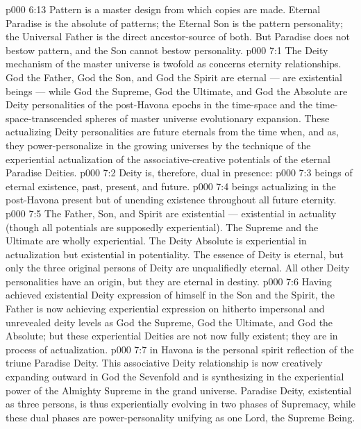 \vs p000 6:13 Pattern is a master design from which copies are made. Eternal Paradise is the absolute of patterns; the Eternal Son is the pattern personality; the Universal Father is the direct ancestor\hyp{}source of both. But Paradise does not bestow pattern, and the Son cannot bestow personality.
\vs p000 7:1 The Deity mechanism of the master universe is twofold as concerns eternity relationships. God the Father, God the Son, and God the Spirit are eternal --- are existential beings --- while God the Supreme, God the Ultimate, and God the Absolute are  Deity personalities of the post\hyp{}Havona epochs in the time\hyp{}space and the time\hyp{}space\hyp{}transcended spheres of master universe evolutionary expansion. These actualizing Deity personalities are future eternals from the time when, and as, they power\hyp{}personalize in the growing universes by the technique of the experiential actualization of the associative\hyp{}creative potentials of the eternal Paradise Deities.
\vs p000 7:2 Deity is, therefore, dual in presence:
\vs p000 7:3 \bibnobreakspace {} beings of eternal existence, past, present, and future.
\vs p000 7:4 \bibnobreakspace {} beings actualizing in the post\hyp{}Havona present but of unending existence throughout all future eternity.
\vs p000 7:5 \pc The Father, Son, and Spirit are existential --- existential in actuality (though all potentials are supposedly experiential). The Supreme and the Ultimate are wholly experiential. The Deity Absolute is experiential in actualization but existential in potentiality. The essence of Deity is eternal, but only the three original persons of Deity are unqualifiedly eternal. All other Deity personalities have an origin, but they are eternal in destiny.
\vs p000 7:6 Having achieved existential Deity expression of himself in the Son and the Spirit, the Father is now achieving experiential expression on hitherto impersonal and unrevealed deity levels as God the Supreme, God the Ultimate, and God the Absolute; but these experiential Deities are not now fully existent; they are in process of actualization.
\vs p000 7:7 \pc {} in Havona is the personal spirit reflection of the triune Paradise Deity. This associative Deity relationship is now creatively expanding outward in God the Sevenfold and is synthesizing in the experiential power of the Almighty Supreme in the grand universe. Paradise Deity, existential as three persons, is thus experientially evolving in two phases of Supremacy, while these dual phases are power\hyp{}personality unifying as one Lord, the Supreme Being.
